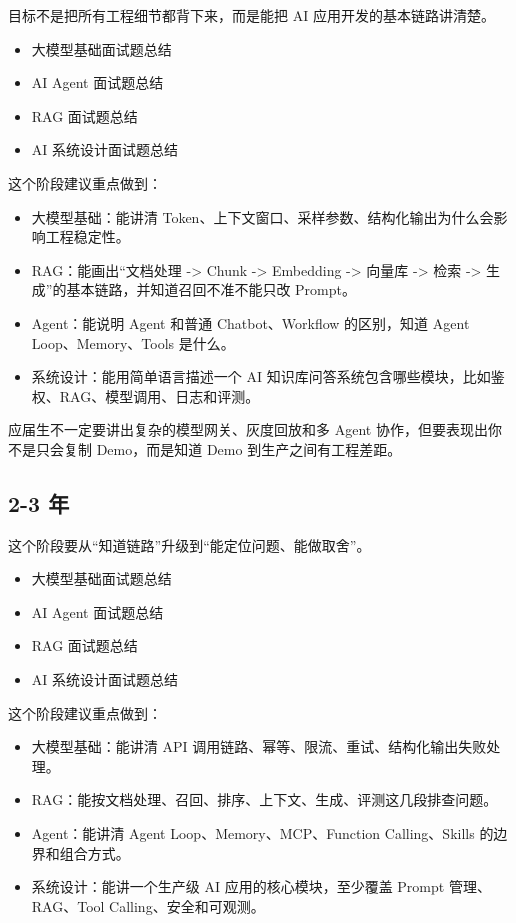 \documentclass[9pt,a4paper,twocolumn]{ctexart}
\begin{document}
目标不是把所有工程细节都背下来，而是能把 AI 应用开发的基本链路讲清楚。


\begin{itemize}[itemsep=1pt, topsep=2pt]
  \item 大模型基础面试题总结
  \item AI Agent 面试题总结
  \item RAG 面试题总结
  \item AI 系统设计面试题总结
\end{itemize}


这个阶段建议重点做到：


\begin{itemize}[itemsep=1pt, topsep=2pt]
  \item 大模型基础：能讲清 Token、上下文窗口、采样参数、结构化输出为什么会影响工程稳定性。
  \item RAG：能画出“文档处理 -> Chunk -> Embedding -> 向量库 -> 检索 -> 生成”的基本链路，并知道召回不准不能只改 Prompt。
  \item Agent：能说明 Agent 和普通 Chatbot、Workflow 的区别，知道 Agent Loop、Memory、Tools 是什么。
  \item 系统设计：能用简单语言描述一个 AI 知识库问答系统包含哪些模块，比如鉴权、RAG、模型调用、日志和评测。
\end{itemize}


应届生不一定要讲出复杂的模型网关、灰度回放和多 Agent 协作，但要表现出你不是只会复制 Demo，而是知道 Demo 到生产之间有工程差距。



\subsection*{2-3 年}


这个阶段要从“知道链路”升级到“能定位问题、能做取舍”。


\begin{itemize}[itemsep=1pt, topsep=2pt]
  \item 大模型基础面试题总结
  \item AI Agent 面试题总结
  \item RAG 面试题总结
  \item AI 系统设计面试题总结
\end{itemize}


这个阶段建议重点做到：


\begin{itemize}[itemsep=1pt, topsep=2pt]
  \item 大模型基础：能讲清 API 调用链路、幂等、限流、重试、结构化输出失败处理。
  \item RAG：能按文档处理、召回、排序、上下文、生成、评测这几段排查问题。
  \item Agent：能讲清 Agent Loop、Memory、MCP、Function Calling、Skills 的边界和组合方式。
  \item 系统设计：能讲一个生产级 AI 应用的核心模块，至少覆盖 Prompt 管理、RAG、Tool Calling、安全和可观测。
\end{itemize}
\end{document}
